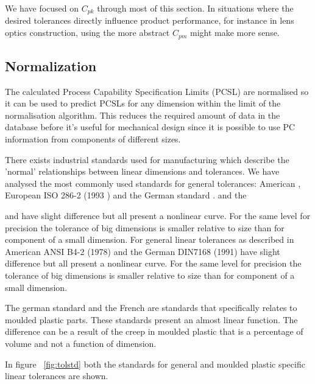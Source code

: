 \documentclass[aip,amsmath, reprint, author-year]{revtex4-1}
\begin{document}
We have focused on $C_{pk}$ through most of this section.
In situations where the desired tolerances directly influence product performance, for instance in lens optics construction, using the more abstract $C_{pm}$ might make more sense. 

\subsection{Normalization}

The calculated Process Capability Specification Limits (PCSL) are normalised so it can be used to predict PCSLs for any dimension within the limit of the normalisation algorithm. 
This reduces the required amount of data in the database before it's useful for mechanical design since it is possible to use PC information from components of different sizes.

There exists industrial standards used for manufacturing which describe the 'normal' relationships between linear dimensions and tolerances. We have analysed the most commonly used standards for general tolerances: American \citeauthor{american1978preferred}, European ISO 286-2 (1993 ) and the German standard \citeauthor{DIN7168}.
and the 

   and have slight difference but all present a nonlinear curve. For the same level for precision the tolerance of big dimensions is smaller relative to size than for component of a small dimension.
For general linear tolerances as described in American ANSI B4-2 (1978) and the German DIN7168 (1991) have slight difference but all present a nonlinear curve. For the same level for precision the tolerance of big dimensions is smaller relative to size than for component of a small dimension.

The german standard \citeauthor{DIN16901} and the French \citeauthor{NFT58000} are standards that specifically relates to moulded plastic parts. These standards present an almost linear function. The difference can be a result of the creep in moulded plastic that is a percentage of volume and not a function of dimension.

In figure ~\ref{fig:tolstd} both the standards for general and moulded plastic specific linear tolerances are shown.
\end{document}
